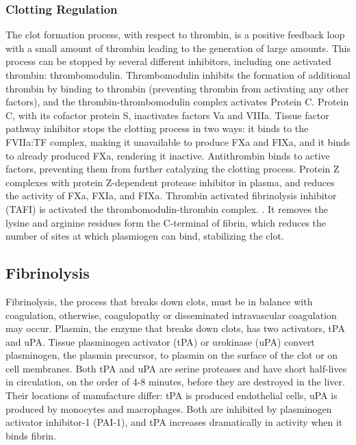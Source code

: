 \documentclass[12pt]{article}
\begin{document}
\subsubsection*{Clotting Regulation}
The clot formation process, with respect to thrombin, is a positive feedback loop with a small amount of thrombin leading to the generation of large amounts. This process can be stopped by several different inhibitors, including one activated thrombin: thrombomodulin. Thrombomodulin inhibits the formation of additional thrombin by binding to thrombin (preventing thrombin from activating any other factors), and the thrombin-thrombomodulin complex activates Protein C. \cite{esmon1989roles} Protein C, with its cofactor protein S, inactivates factors Va and VIIIa. \citep{esmon1987anticoagulation}
Tissue factor pathway inhibitor stops the clotting process in two ways: it binds to the FVIIa:TF complex, making it unavailable to produce FXa and FIXa, and it binds to already produced FXa, rendering it inactive. \cite{lwaleed2006tissue} Antithrombin binds to active factors, preventing them from further catalyzing the clotting process. \cite{olson1994regulation}  Protein Z complexes with protein Z-dependent protease inhibitor in plasma, and reduces the activity of FXa, FXIa, and FIXa. \citep {corral2007protein}
Thrombin activated fibrinolysis inhibitor (TAFI) is activated the thrombomodulin-thrombin complex. \citep{chapin2015fibrinolysis}. It removes the lysine and arginine residues form the C-terminal of fibrin, which reduces the number of sites at which plasmiogen can bind, stabilizing the clot. 
\subsection*{Fibrinolysis}
Fibrinolysis, the process that breaks down clots, must be in balance with coagulation, otherwise, coagulopathy or disseminated intravascular coagulation may occur. Plasmin, the enzyme that breaks down clots, has two activators, tPA and uPA. \cite{wiman1978molecular} Tissue plasminogen activator (tPA) or urokinase (uPA) convert plasminogen, the plasmin precursor, to plasmin on the surface of the clot or on cell membranes. \citep{chapin2015fibrinolysis} Both tPA and uPA are serine proteases and have short half-lives in circulation, on the order of 4-8 minutes, before they are destroyed in the liver. Their locations of manufacture differ: tPA is produced endothelial cells, uPA is produced by monocytes and macrophages. Both are inhibited by plasminogen activator inhibitor-1 (PAI-1), and tPA increases dramatically in activity when it binds fibrin. \citep{chapin2015fibrinolysis}
\end{document}
